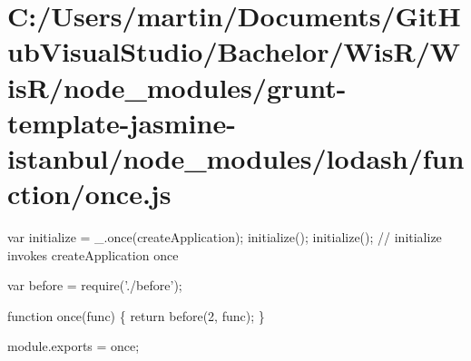 \hypertarget{_c_1_2_users_2martin_2_documents_2_git_hub_visual_studio_2_bachelor_2_wis_r_2_wis_r_2node_module6c41b0634a9b1251f449a7abc00e73e0}{}\section{C\+:/\+Users/martin/\+Documents/\+Git\+Hub\+Visual\+Studio/\+Bachelor/\+Wis\+R/\+Wis\+R/node\+\_\+modules/grunt-\/template-\/jasmine-\/istanbul/node\+\_\+modules/lodash/function/once.\+js}
var initialize = \+\_\+.\+once(create\+Application); initialize(); initialize(); // {\ttfamily initialize} invokes {\ttfamily create\+Application} once


\begin{DoxyCodeInclude}
var before = require(\textcolor{stringliteral}{'./before'});

\textcolor{keyword}{function} once(func) \{
  \textcolor{keywordflow}{return} before(2, func);
\}

module.exports = once;
\end{DoxyCodeInclude}
 